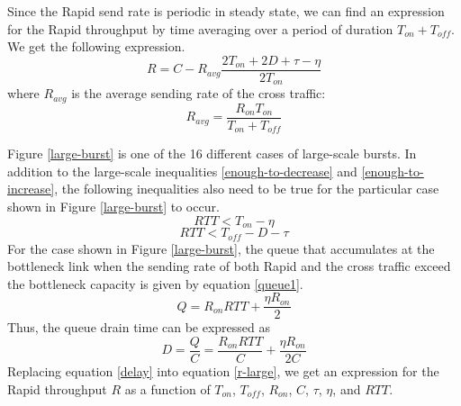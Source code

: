   Since the Rapid send rate is periodic in steady state, we can find an 
  expression for the Rapid throughput by time averaging over a period of 
  duration $T_{on} + T_{off}$. We get the following expression.
  \begin{equation}
    R = C - R_{avg} \frac{2 T_{on} + 2 D + \tau - \eta}{2 T_{on}}
    \label{r-large}
  \end{equation}
  where $R_{avg}$ is the average sending rate of the cross traffic:
  \begin{equation}
    R_{avg} = \frac{R_{on} T_{on}}{T_{on} + T_{off}}
  \end{equation}

  Figure \ref{large-burst} is one of the 16 different cases of large-scale 
  bursts. In addition to the large-scale inequalities \ref{enough-to-decrease} 
  and \ref{enough-to-increase}, the following inequalities also need to be true 
  for the particular case shown in Figure \ref{large-burst} to occur.
  \begin{equation}
    RTT < T_{on} - \eta
  \end{equation}
  \begin{equation}
    RTT < T_{off} - D - \tau
  \end{equation}
  For the case shown in Figure \ref{large-burst}, the queue that accumulates 
  at the bottleneck link when the sending rate of both Rapid and the cross 
  traffic exceed the bottleneck capacity is given by equation 
  \eqref{queue1}.
  \begin{equation}
    Q = R_{on} RTT + \frac{\eta R_{on}}{2}
    \label{queue1}
  \end{equation}
  Thus, the queue drain time can be expressed as
  \begin{equation}
    D = \frac{Q}{C} = \frac{R_{on} RTT}{C} + \frac{\eta R_{on}}{2C}
    \label{delay}
  \end{equation}
  Replacing equation \eqref{delay} into equation \eqref{r-large}, we get an 
  expression for the Rapid throughput $R$ as a function of $T_{on}$, 
  $T_{off}$, $R_{on}$, $C$, $\tau$, $\eta$, and $RTT$.
